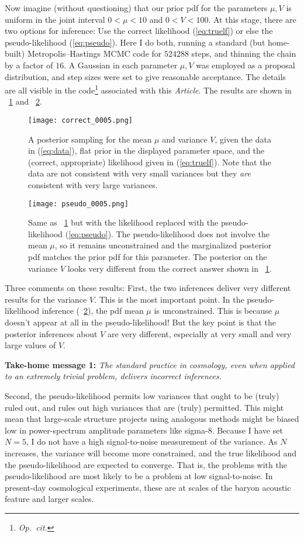 \documentclass[12pt, letterpaper, preprint]{aastex}
\newcommand{\foreign}[1]{\textsl{#1}}
\newcommand{\opcit}{\foreign{Op.~cit.}}
\newcommand{\documentname}{\textsl{Article}}
\begin{document}
Now imagine (without questioning) that our prior pdf for the
parameters $\mu, V$ is uniform in the joint interval $0<\mu<10$ and
$0<V<100$.
At this stage, there are two options for inference: Use the correct
likelihood (\ref{eq:truelf}) or else the pseudo-likelihood
(\ref{eq:pseudo}).
Here I do both, running a standard (but home-built) Metropolis--Hastings
MCMC code for $524288$ steps, and thinning the chain by a factor of
$16$.
A Gaussian in each parameter $\mu,V$ was employed as a proposal
distribution, and step sizes were set to give reasonable acceptance.
The details are all visible in the code\footnote{\opcit} associated
with this \documentname.
The results are shown in \figurename~\ref{fig:correct} and
\figurename~\ref{fig:pseudo}.%
\begin{figure}
\texttt{[image: correct\_0005.png]}
\caption{A posterior sampling for the mean $\mu$ and variance $V$,
  given the data in (\ref{eq:data}), flat prior in the displayed
  parameter space, and the (correct, appropriate) likelihood given in
  (\ref{eq:truelf}). Note that the data are not consistent with very
  small variances but they \emph{are} consistent with very large
  variances.\label{fig:correct}}
\end{figure}%
\begin{figure}
\texttt{[image: pseudo\_0005.png]}
\caption{Same as \figurename~\ref{fig:correct} but with the likelihood
  replaced with the pseudo-likelihood (\ref{eq:pseudo}). The
  pseudo-likelihood does not involve the mean $\mu$, so it remains
  unconstrained and the marginalized posterior pdf matches the prior
  pdf for this parameter. The posterior on the variance $V$ looks very
  different from the correct answer shown in
  \figurename~\ref{fig:correct}.\label{fig:pseudo}}
\end{figure}

Three comments on these results:
First, the two inferences deliver very different results for the
variance $V$. This is the most important point.
In the pseudo-likelihood inference (\figurename~\ref{fig:pseudo}), the
pdf mean $\mu$ is unconstrained. This is because $\mu$ doesn't appear
at all in the pseudo-likelihood! But the key point is that the
posterior inferences about $V$ are very different, especially at very
small and very large values of $V$.

\textbf{Take-home message 1:} \emph{The standard practice in
  cosmology, even when applied to an extremely trivial problem,
  delivers incorrect inferences.}

Second, the pseudo-likelihood permits low variances that ought
to be (truly) ruled out, and rules out high variances that are (truly)
permitted.
This might mean that large-scale structure projects using analogous
methods might be biased low in power-spectrum amplitude parameters
like sigma-8.
Because I have set $N=5$, I do not have a high signal-to-noise
measurement of the variance.
As $N$ increases, the variance will become more constrained, and the
true likelihood and the pseudo-likelihood are expected to converge.
That is, the problems with the pseudo-likelihood are most likely to be
a problem at low signal-to-noise.
In present-day cosmological experiments, these are at scales of the
baryon acoustic feature and larger scales.
\end{document}
